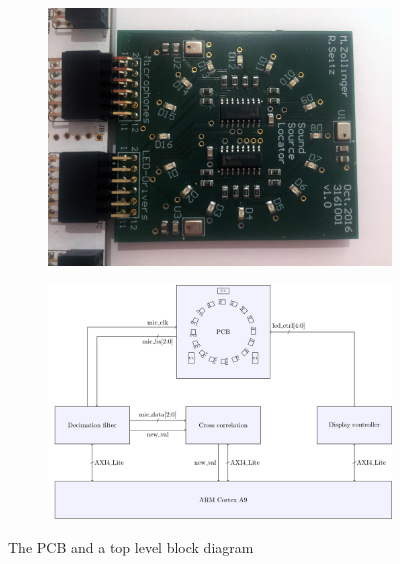 
\usepackage{subcaption}


\maketitle
\setcounter{tocdepth}{2}

\begin{figure}[htbp]
	\begin{subfigure}{0.5\textwidth}
		\centering
		\includegraphics[scale=.055]{./block_diagram/pcb.jpg}
		\label{fig::pcb_view}
	\end{subfigure}
	\begin{subfigure}{0.5\textwidth}
		\centering
		\includegraphics[scale=.38]{./block_diagram/system_top.pdf}
		\label{fig::top_block}
	\end{subfigure}
	\caption{The PCB and a top level block diagram}
	\label{fig::system}
\end{figure}

 






